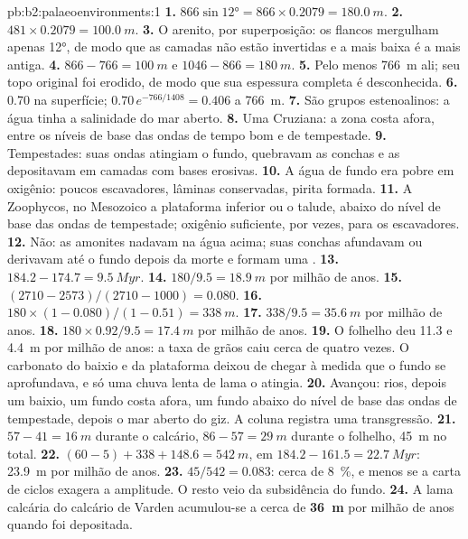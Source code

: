 \begin{solution}{pb:b2:palaeoenvironments:1}
\textbf{1.} $866 \sin \ang{12} = 866 \times 0.2079 = \qty{180.0}{m}$.
\textbf{2.} $481 \times 0.2079 = \qty{100.0}{m}$.
\textbf{3.} O arenito, por superposição: os flancos mergulham apenas \ang{12}, de modo que as camadas não estão
invertidas e a mais baixa é a mais antiga.
\textbf{4.} $866 - 766 = \qty{100}{m}$ e $1046 - 866 = \qty{180}{m}$.
\textbf{5.} Pelo menos \qty{766}{m} ali; seu topo original foi erodido, de modo que sua espessura completa é
desconhecida.
\textbf{6.} 0.70 na superfície; $0.70\,e^{-766/1408} = 0.406$ a \qty{766}{m}.
\textbf{7.} São grupos estenoalinos: a água tinha a salinidade do mar aberto.
\textbf{8.} Uma  Cruziana: a zona costa afora, entre os níveis de base das ondas de tempo bom e de
tempestade.
\textbf{9.} Tempestades: suas ondas atingiam o fundo, quebravam as conchas e as depositavam em camadas
com bases erosivas.
\textbf{10.} A água de fundo era pobre em oxigênio: poucos escavadores, lâminas conservadas, pirita formada.
\textbf{11.} A  Zoophycos, no Mesozoico a plataforma inferior ou o talude, abaixo do
nível de base das ondas de tempestade; oxigênio suficiente, por vezes, para os escavadores.
\textbf{12.} Não: as amonites nadavam na água acima; suas conchas afundavam ou derivavam até o fundo
depois da morte e formam uma .
\textbf{13.} $184.2 - 174.7 = \qty{9.5}{Myr}$.
\textbf{14.} $180/9.5 = \qty{18.9}{m}$ por milhão de anos.
\textbf{15.} $(2710 - 2573)/(2710 - 1000) = 0.080$.
\textbf{16.} $180 \times (1 - 0.080)/(1 - 0.51) = \qty{338}{m}$.
\textbf{17.} $338/9.5 = \qty{35.6}{m}$ por milhão de anos.
\textbf{18.} $180 \times 0.92/9.5 = \qty{17.4}{m}$ por milhão de anos.
\textbf{19.} O folhelho deu 11.3 e \qty{4.4}{m} por milhão de anos: a taxa de grãos caiu
cerca de quatro vezes. O carbonato do baixio e da plataforma deixou de chegar à medida que o fundo
se aprofundava, e só uma chuva lenta de lama o atingia.
\textbf{20.} Avançou: rios, depois um baixio, um fundo costa afora, um fundo abaixo do nível de base das ondas de
tempestade, depois o mar aberto do giz. A coluna registra uma transgressão.
\textbf{21.} $57 - 41 = \qty{16}{m}$ durante o calcário, $86 - 57 = \qty{29}{m}$ durante o folhelho,
\qty{45}{m} no total.
\textbf{22.} $(60 - 5) + 338 + 148.6 = \qty{542}{m}$, em $184.2 - 161.5 = \qty{22.7}{Myr}$:
\qty{23.9}{m} por milhão de anos.
\textbf{23.} $45/542 = 0.083$: cerca de \qty{8}{\percent}, e menos se a carta de ciclos exagera
a amplitude. O resto veio da subsidência do fundo.
\textbf{24.} A lama calcária do calcário de Varden acumulou-se a cerca de
\textbf{\qty[text-series-to-math=true]{36}{m}} por milhão de anos quando foi depositada.
\end{solution}
